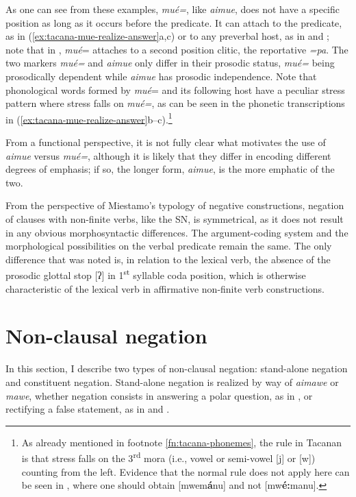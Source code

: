 \documentclass[output=paper]{langsci/langscibook}
\begin{document}
As one can see from these examples, \textit{mué=}, like \textit{aimue},
does not have a specific position as long as it occurs before the
predicate. It can attach to the predicate, as in
(\ref{ex:tacana-mue-realize-answer}a,c) or to any preverbal host, as in
 and ; note that in
, \textit{mué}= attaches to a second position clitic,
the reportative \textit{=pa}. The two markers \textit{mué=} and
\textit{aimue} only differ in their prosodic status, \textit{mué=} being
prosodically dependent while \textit{aimue} has prosodic independence. Note
that phonological words formed by \textit{mué}= and its following host have
a peculiar stress pattern where stress falls on \textit{mué=}, as can be
seen in the phonetic transcriptions in
(\ref{ex:tacana-mue-realize-answer}b--c).\footnote{As already mentioned in footnote \ref{fn:tacana-phonemes}, the rule in Tacanan is that
stress falls on the 3\textsuperscript{rd} mora (i.e., vowel or semi-vowel
[j] or [w]) counting from the left. Evidence that the normal rule does not
apply here can be seen in , where one should obtain [mwem\textbf{á}nu] and not [mw\textbf{é:}manu].} 

From a functional perspective, it is not fully clear what motivates the use
of \textit{aimue} versus \textit{mué=}, although it is likely that they
differ in encoding different degrees of emphasis; if so, the longer form, \textit{aimue}, is the more emphatic of the two.

From the perspective of Miestamo's \parencites*{Miestamo2005}{Miestamo2007}
typology of negative constructions, negation of clauses with non-finite
verbs, like the SN, is symmetrical, as it does not result in any obvious
morphosyntactic differences. The argument-coding system and the
morphological possibilities on the verbal predicate remain the same. The
only difference that was noted is, in relation to the lexical verb, the absence of the prosodic glottal stop [ʔ] in 1\textsuperscript{st} syllable coda position, which is otherwise characteristic of the lexical verb in affirmative non-finite verb constructions.

\section{Non-clausal negation}\label{sec:tacana-7}

In this section, I describe two types of non-clausal negation: stand-alone
negation and constituent negation. Stand-alone negation is
realized by way of \textit{aimawe} or \textit{mawe}, whether negation
consists in answering a polar question, as in
, or rectifying a false statement, as in
 and .
\end{document}
